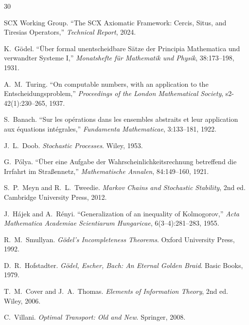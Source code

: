 \documentclass[12pt,a4paper]{article}
\begin{document}

\begin{thebibliography}{30}

SCX Working Group.
\newblock ``The SCX Axiomatic Framework: Cercis, Situs, and Tiresias
Operators,''
\newblock \emph{Technical Report}, 2024.

K.~G\"odel.
\newblock ``\"Uber formal unentscheidbare S\"atze der Principia Mathematica
und verwandter Systeme I,''
\newblock \emph{Monatshefte f\"ur Mathematik und Physik}, 38:173--198, 1931.

A.~M.~Turing.
\newblock ``On computable numbers, with an application to the
Entscheidungsproblem,''
\newblock \emph{Proceedings of the London Mathematical Society},
s2-42(1):230--265, 1937.

S.~Banach.
\newblock ``Sur les op\'erations dans les ensembles abstraits et leur
application aux \'equations int\'egrales,''
\newblock \emph{Fundamenta Mathematicae}, 3:133--181, 1922.

J.~L.~Doob.
\newblock \emph{Stochastic Processes}.
\newblock Wiley, 1953.

G.~P\'olya.
\newblock ``\"Uber eine Aufgabe der Wahrscheinlichkeitsrechnung betreffend die
Irrfahrt im Stra\ss ennetz,''
\newblock \emph{Mathematische Annalen}, 84:149--160, 1921.

S.~P.~Meyn and R.~L.~Tweedie.
\newblock \emph{Markov Chains and Stochastic Stability}, 2nd ed.
\newblock Cambridge University Press, 2012.

J.~H\'ajek and A.~R\'enyi.
\newblock ``Generalization of an inequality of Kolmogorov,''
\newblock \emph{Acta Mathematica Academiae Scientiarum Hungaricae},
6(3--4):281--283, 1955.

R.~M.~Smullyan.
\newblock \emph{G\"odel's Incompleteness Theorems}.
\newblock Oxford University Press, 1992.

D.~R.~Hofstadter.
\newblock \emph{G\"odel, Escher, Bach: An Eternal Golden Braid}.
\newblock Basic Books, 1979.

T.~M.~Cover and J.~A.~Thomas.
\newblock \emph{Elements of Information Theory}, 2nd ed.
\newblock Wiley, 2006.

C.~Villani.
\newblock \emph{Optimal Transport: Old and New}.
\newblock Springer, 2008.

\end{thebibliography}
\end{document}
